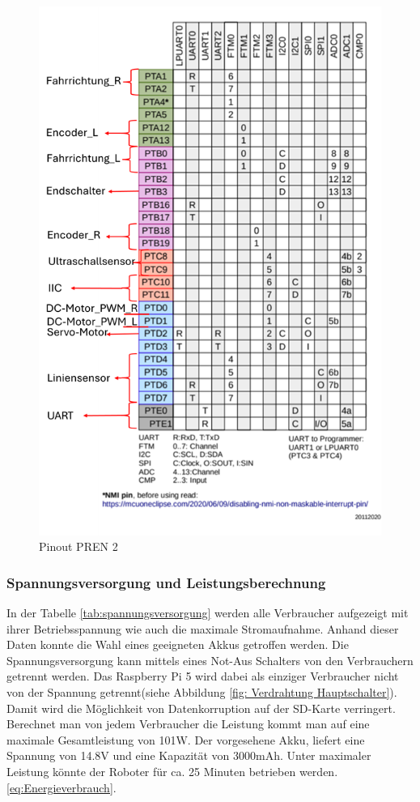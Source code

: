 \begin{figure}[H]
\begin{minipage}[b]{0.45\textwidth}
  \includegraphics[width=\textwidth]{assets/ET/PINOUT/Pinout_PREN2.png}
  \caption{Pinout PREN 2}
  \label{fig:Pinout PREN 2}
\end{minipage}
\end{figure}





\subsubsection{Spannungsversorgung und Leistungsberechnung}


In der Tabelle \ref{tab:spannungsversorgung} werden alle Verbraucher aufgezeigt mit ihrer Betriebsspannung wie auch die maximale Stromaufnahme. Anhand dieser Daten konnte die Wahl eines geeigneten Akkus getroffen werden. Die Spannungsversorgung kann mittels eines Not-Aus Schalters von den Verbrauchern getrennt werden. Das Raspberry Pi 5 wird dabei als einziger Verbraucher nicht von der Spannung getrennt(siehe Abbildung \ref{fig: Verdrahtung Hauptschalter}). Damit wird die Möglichkeit von Datenkorruption auf der SD-Karte verringert. Berechnet man von jedem Verbraucher die Leistung kommt man auf eine maximale Gesamtleistung von 101W. Der vorgesehene Akku, liefert eine Spannung von 14.8V und eine Kapazität von 3000mAh. Unter maximaler Leistung könnte der Roboter für ca. 25 Minuten betrieben werden. \ref{eq:Energieverbrauch}.

